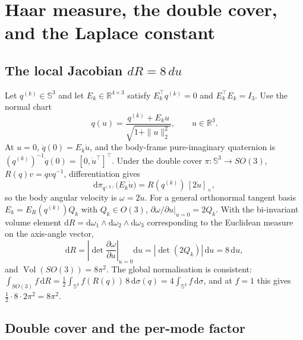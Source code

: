 \section{Haar measure, the double cover, and the Laplace constant}\label{app:haar}

\subsection*{The local Jacobian \texorpdfstring{$dR=8\,du$}{dR=8du}}

Let $q^{(k)}\in\mathbb{S}^3$ and let $E_k\in\mathbb{R}^{4\times3}$ satisfy $E_k^\top q^{(k)}=0$ and $E_k^\top E_k=I_3$. Use the normal chart
\begin{equation}
q(u)=\frac{q^{(k)}+E_ku}{\sqrt{1+\|u\|_2^2}},\qquad u\in\mathbb{R}^3 .
\label{eq:app-chart}
\end{equation}
At $u=0$, $\dot q(0)=E_k\dot u$, and the body-frame pure-imaginary quaternion is $(q^{(k)})^{-1}\dot q(0)=[0,\dot u^\top]^\top$. Under the double cover $\pi:\mathbb{S}^3\to SO(3)$, $R(q)v=qvq^{-1}$, differentiation gives
\begin{equation}
\mathrm{d}\pi_{q^{(k)}}\big(E_k\dot u\big)=R(q^{(k)})\,[2\dot u]_\times ,
\label{eq:app-dpi}
\end{equation}
so the body angular velocity is $\omega=2\dot u$. For a general orthonormal tangent basis $E_k=E_R(q^{(k)})Q_k$ with $Q_k\in O(3)$, $\partial\omega/\partial u|_{u=0}=2Q_k$. With the bi-invariant volume element $\mathrm{d}R=\mathrm{d}\omega_1\wedge\mathrm{d}\omega_2\wedge\mathrm{d}\omega_3$ corresponding to the Euclidean measure on the axis-angle vector,
\begin{equation}
\mathrm{d}R=\left|\det\frac{\partial\omega}{\partial u}\right|_{u=0}\mathrm{d}u
=|\det(2Q_k)|\,\mathrm{d}u=8\,\mathrm{d}u,
\label{eq:app-jac}
\end{equation}
and $\operatorname{Vol}(SO(3))=8\pi^2$.
The global normalisation is consistent: $\int_{SO(3)}f\,\mathrm{d}R=\frac12\int_{\mathbb{S}^3}f(R(q))\,8\,\mathrm{d}\sigma(q)=4\int_{\mathbb{S}^3}f\,\mathrm{d}\sigma$, and at $f=1$ this gives $\frac12\cdot8\cdot2\pi^2=8\pi^2$.

\subsection*{Double cover and the per-mode factor}

